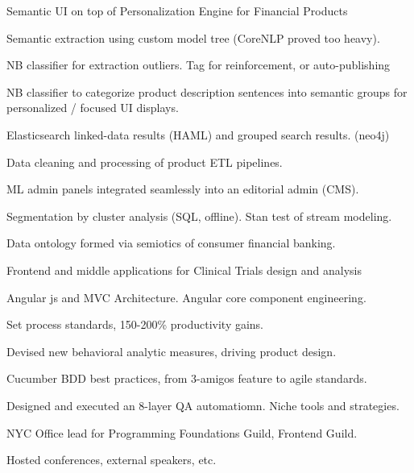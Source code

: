 \documentclass[letterpaper]{deedy-resume} %
\begin{document}
\begin{minipage}[t]{0.66\textwidth}
\sectionspace %



\vspace{\topsep} %
Semantic UI on top of Personalization Engine for Financial Products
\begin{tightitemize}
\item Semantic extraction using custom model tree (CoreNLP proved too heavy).
\item NB classifier for extraction outliers. Tag for reinforcement, or auto-publishing
\item NB classifier to categorize product description sentences into semantic groups for personalized / focused UI displays.
\item Elasticsearch linked-data results (HAML) and grouped search results. (neo4j)
\item Data cleaning and processing of product ETL pipelines.
\item ML admin panels integrated seamlessly into an editorial admin (CMS).
\item Segmentation by cluster analysis (SQL, offline).  Stan test of stream modeling.
\item Data ontology formed via semiotics of consumer financial banking.

\end{tightitemize}

\sectionspace %



Frontend and middle applications for Clinical Trials design and analysis
\vspace{\topsep} %
\begin{tightitemize}
\item Angular js and MVC Architecture.  Angular core component engineering.
\item Set process standards, 150-200\% productivity gains. 
\item Devised new behavioral analytic measures, driving product design.
\item Cucumber BDD best practices, from 3-amigos feature to agile standards.
\item Designed and executed an 8-layer QA automatiomn. Niche tools and strategies.
\item NYC Office lead for Programming Foundations Guild, Frontend Guild. 
\item Hosted conferences, external speakers, etc. 
\end{tightitemize}


\end{minipage}
\end{document}
